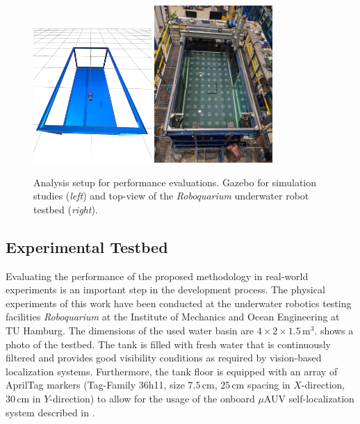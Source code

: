 \begin{figure}
    \centering
    \includegraphics[width=0.4\textwidth]{images/04/gazebo.png}
    \quad\quad
    \includegraphics[width=0.4\textwidth]{images/04/roboquarium_tested_topview.jpg}
    \caption{Analysis setup for performance evaluations. Gazebo for simulation studies (\textit{left}) and top-view of the \textit{Roboquarium} underwater robot testbed (\textit{right}).}
    \label{fig:testbed_topview}
    \label{fig:analysis_setups}
\end{figure}
\subsection{Experimental Testbed}
\label{sec:experimental-testbed}
Evaluating the performance of the proposed methodology in real-world experiments is an important step in the development process.
The physical experiments of this work have been conducted at the underwater robotics testing facilities \textit{Roboquarium} at the Institute of Mechanics and Ocean Engineering at TU Hamburg.
The dimensions of the used water basin are $4\times2\times1.5\,\mathrm{m}^3$.
 shows a photo of the testbed.
The tank is filled with fresh water that is continuously filtered and provides good visibility conditions as required by vision-based localization systems.
Furthermore, the tank floor is equipped with an array of AprilTag markers (Tag-Family 36h11, size $7.5$\,cm, $25$\,cm spacing in $X$-direction, $30$\,cm in $Y$-direction) to allow for the usage of the onboard $\mu$AUV self-localization system described in \cite{Duecker20}.


